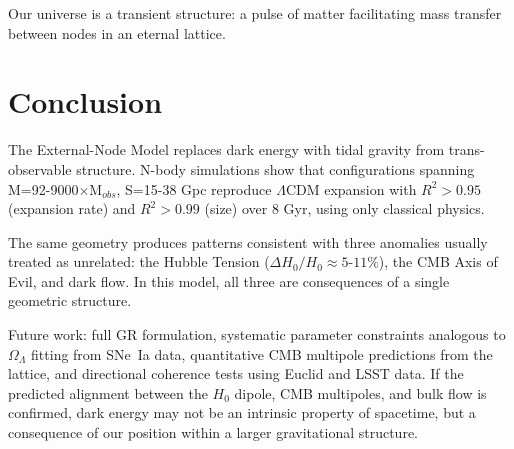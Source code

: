 \documentclass{article}
\begin{document}
Our universe is a transient structure: a pulse of matter facilitating mass transfer between nodes in an eternal lattice.

\section{Conclusion}
\label{sec:conclusion}
The External-Node Model replaces dark energy with tidal gravity from trans-observable structure.
N-body simulations show that configurations spanning M=92-9000$\times$M$_{obs}$, S=15-38 Gpc reproduce $\Lambda$CDM expansion with $R^2 > 0.95$ (expansion rate) and $R^2 > 0.99$ (size) over 8 Gyr, using only classical physics.

The same geometry produces patterns consistent with three anomalies usually treated as unrelated: the Hubble Tension ($\Delta H_0/H_0 \approx 5$-$11\%$), the CMB Axis of Evil, and dark flow.
In this model, all three are consequences of a single geometric structure.

Future work: full GR formulation, systematic parameter constraints analogous to $\Omega_\Lambda$ fitting from SNe~Ia data, quantitative CMB multipole predictions from the lattice, and directional coherence tests using Euclid and LSST data.
If the predicted alignment between the $H_0$ dipole, CMB multipoles, and bulk flow is confirmed, dark energy may not be an intrinsic property of spacetime, but a consequence of our position within a larger gravitational structure.
\end{document}

